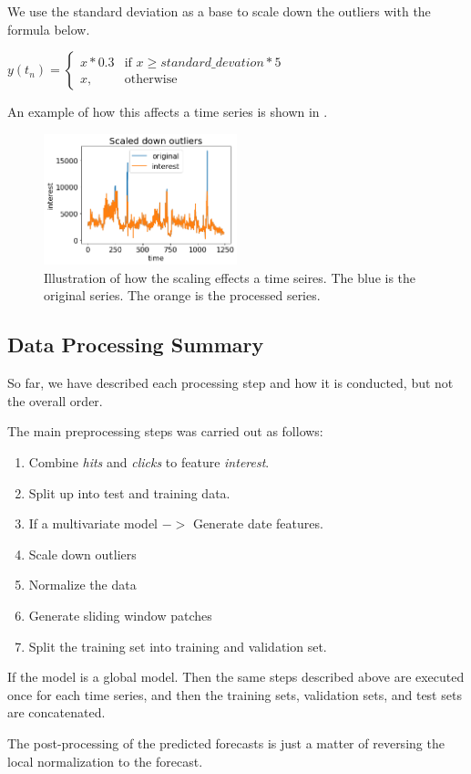 We use the standard deviation as a base to scale down the outliers with the formula below.

$y(t_n)=
  \begin{cases}
    x * 0.3 & \text{if } x\geq standard\_devation * 5 \\
    x,      & \text{otherwise}
  \end{cases}$

An example of how this affects a time series is shown in .
\begin{figure}[h!]
  \centering
  \includegraphics[width=0.5\textwidth]{./figs/code_generated/data_exploration/scaled_down_outliers.png}
  \hfill
  \caption{Illustration of how the scaling effects a time seires. The blue is the original series. The orange is the processed series.}
  \label{fig:illustration:scaled-down-outliers}
\end{figure}

\subsection{Data Processing Summary}
So far, we have described each processing step and how it is conducted, but not the overall
order.

The main preprocessing steps was carried out as follows:
\begin{enumerate}
  \item Combine \textit{hits} and \textit{clicks} to feature \textit{interest}.
  \item Split up into test and training data.
  \item If a multivariate model $->$ Generate date features.
  \item Scale down outliers %
  \item Normalize the data %
  \item Generate sliding window patches %
  \item Split the training set into training and validation set.
\end{enumerate}

If the model is a global model. Then the same steps described above are executed once
for each time series, and then the training sets, validation sets, and test sets are concatenated.

The post-processing of the predicted forecasts is just a matter of reversing the local
normalization to the forecast.
